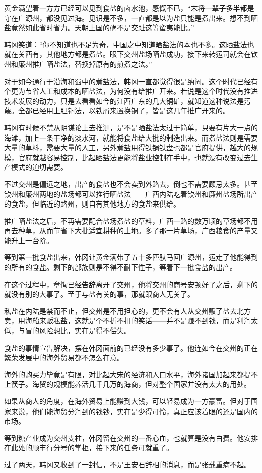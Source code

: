黄金满望着一方方已经可以见到食盐的卤水池，感慨不已，“末将一辈子多半都是守在广源州，都没见过海。见识是不多，一直都是以为盐只能是煮出来。想不到晒盐竟然如此省时省力。天朝上国的确不是交趾这等蛮夷能比。”

韩冈笑道：“你不知道也不足为奇，中国之中知道晒盐法的本也不多。这晒盐法也就在关西有，其他地方都是煮盐。眼下交州盐场晒盐成功，接下来转运司就会在钦州和廉州推广晒盐法，替换掉原有的煎煮之法。”

对于如今通行于沿海和蜀中的煮盐法，韩冈一直都觉得很是纳闷。这个时代已经有个更为节省人工和成本的晒盐法，为何没有给推广开来。若说是这个时代没有推进技术发展的动力，只是去看看如今的江西广东的几大铜矿，就知道这种说法是污蔑。全都已经用上胆铜法，以铁屑来置换铜了，皆是这几年推广开来的。

韩冈有时候不禁从阴谋论上去推测，是不是晒盐法太过于简单，只要有片大一点的海滩，加上一条干净的淡水河，就能将食盐给大批的制造出来。而煮盐法则是需要大量的草料，需要大量的人工，另外煮盐用得铁锅铁盘也都是官府提供，越大的规模，官府就越容易控制，比起晒盐法更能将盐业控制在手中，也就没有改变过去生产模式的迫切需要。

不过交州是偏远之地，出产的食盐也不会卖到外路去，倒也不需要顾忌太多。甚至钦州和廉州两地的盐场都可以推行晒盐法——广西内陆吃着钦州和廉州盐场所出产的食盐，但临近的路州，则自有其他地方的食盐来供给。

推广晒盐法之后，不再需要配合盐场煮盐的草料，广西一路的数万顷的草场都不用再去种草，从而节省下大批适宜耕种的土地。多了那一片草场，广西粮食的产量又能升上一台阶。

等到第一批食盐出来，韩冈让黄金满带了五十多匹驮马回广源州，运走了他能得到的所有的食盐。剩下的部族则是不得不耐下性子，等着下一批食盐的出产。

在这个过程中，章恂已经告辞离开了交州，他将交州的商号安顿好了之后，剩下的就没有别的大事了。至于与盐有关的事，那就跟商人无关了。

私盐在内陆是禁而不止，但交州是不用担心的，更不会有人从交州贩了盐去北方卖，用海船来贩私盐，这就是个不折不扣的笑话——并不是赚不到钱，而是利润太低，与冒的风险想比，实在是得不偿失。

食盐的事情宣告解决，摆在韩冈面前的已经没有多少事了。他连如今在交州的正在繁荣发展中的海外贸易都不怎么在意。

海外的购买力毕竟是有限，对比起大宋的经济和人口水平，海外诸国加起来都提不上筷子。海贸的规模能养活几千几万的海商，但对整个国家并没有太大的用处。

如果从商人的角度，在海外贸易上能赚到大钱，可以轻易成为一方豪富。但对于国家来说，他们能海贸分润到的钱钞，实在是少得可怜，真正应该着眼的还是国内的市场。

等到糖产业成为交州支柱，韩冈留在交州的一番心血，也就算是没有白费。他安排在此处的顺丰行分号的掌柜，接下来的任务可就重了。

过了两天，韩冈又收到了一封信，不是王安石辞相的消息，而是张载重病不起。

